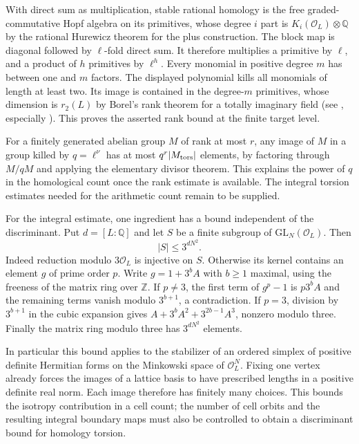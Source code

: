 \documentclass[11pt]{amsart}
\theoremstyle{definition}
\theoremstyle{remark}
\begin{document}
With direct sum as multiplication, stable rational homology is the
free graded-commutative Hopf algebra on its primitives, whose degree
$i$ part is $K_i(\mathcal O_L)\otimes\mathbb Q$ by the rational
Hurewicz theorem for the plus construction. The block map is diagonal
followed by $\ell$-fold direct sum. It therefore multiplies a
primitive by $\ell$, and a product of $h$ primitives by $\ell^h$.
Every monomial in positive degree $m$ has between one and $m$
factors. The displayed polynomial kills all monomials of length at
least two. Its image is contained in the degree-$m$ primitives,
whose dimension is $r_2(L)$ by Borel's rank theorem for a totally
imaginary field (see \cite{CharneyStab,WeibelK}, especially
\cite[IV, \S1]{WeibelK}). This proves the asserted rank bound at
the finite target level.

For a finitely generated abelian group $M$ of rank at most $r$, any
image of $M$ in a group killed by $q=\ell^\nu$ has at most
$q^r|M_{\rm tors}|$ elements, by factoring through $M/qM$ and applying
the elementary divisor theorem. This explains the power of $q$ in
the homological count once the rank estimate is available. The integral torsion estimates needed for the arithmetic count remain to be supplied.

For the integral estimate, one ingredient has a bound independent of
the discriminant. Put $d=[L:\mathbb Q]$ and let $S$ be a finite
subgroup of $\mathrm{GL}_N(\mathcal O_L)$. Then
\[
 |S|\le 3^{dN^2}.
\]
Indeed reduction modulo $3\mathcal O_L$ is injective on $S$.
Otherwise its kernel contains an element $g$ of prime order $p$.
Write $g=1+3^bA$ with $b\ge1$ maximal, using the freeness of the
matrix ring over $\mathbb Z$. If $p\ne3$, the first term of $g^p-1$
is $p3^b A$ and the remaining terms vanish modulo $3^{b+1}$,
a contradiction. If $p=3$, division by $3^{b+1}$ in the cubic
expansion gives $A+3^bA^2+3^{2b-1}A^3$, nonzero modulo three.
Finally the matrix ring modulo three has $3^{dN^2}$ elements.

In particular this bound applies to the stabilizer of an ordered
simplex of positive definite Hermitian forms on the Minkowski space
of $\mathcal O_L^N$. Fixing one vertex already forces the images of a
lattice basis to have prescribed lengths in a positive definite real
norm. Each image therefore has finitely many choices. This bounds
the isotropy contribution in a cell count; the number of cell orbits
and the resulting integral boundary maps must also be controlled to
obtain a discriminant bound for homology torsion.
\end{document}
